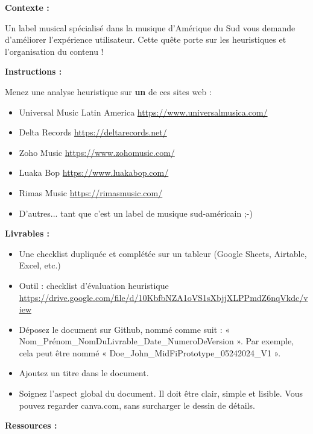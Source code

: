 \makeheaderfiles

\textbf{Contexte :}

Un label musical spécialisé dans la musique d'Amérique du Sud vous demande d'améliorer l'expérience utilisateur. Cette quête porte sur les heuristiques et l'organisation du contenu !

\textbf{Instructions :}

Menez une analyse heuristique sur \textbf{un} de ces sites web :

\begin{itemize}
\item Universal Music Latin America \url{https://www.universalmusica.com/}
\item Delta Records \url{https://deltarecords.net/}
\item Zoho Music \url{https://www.zohomusic.com/}
\item Luaka Bop \url{https://www.luakabop.com/}
\item Rimas Music \url{https://rimasmusic.com/}
\item D'autres... tant que c'est un label de musique sud-américain ;-)
\end{itemize}

\textbf{Livrables :}

\begin{itemize}
\item Une checklist dupliquée et complétée sur un tableur (Google Sheets, Airtable, Excel, etc.)
\item Outil : checklist d'évaluation heuristique \url{https://drive.google.com/file/d/10KbfbNZA1oVS1sXbjjXLPPmdZ6nqVkdc/view}
\item Déposez le document sur Github, nommé comme suit : « Nom\_Prénom\_NomDuLivrable\_Date\_NumeroDeVersion ». Par exemple, cela peut être nommé « Doe\_John\_MidFiPrototype\_05242024\_V1 ».
\item Ajoutez un titre dans le document.
\item Soignez l'aspect global du document. Il doit être clair, simple et lisible. Vous pouvez regarder canva.com, sans surcharger le dessin de détails.
\end{itemize}

\textbf{Ressources :}

